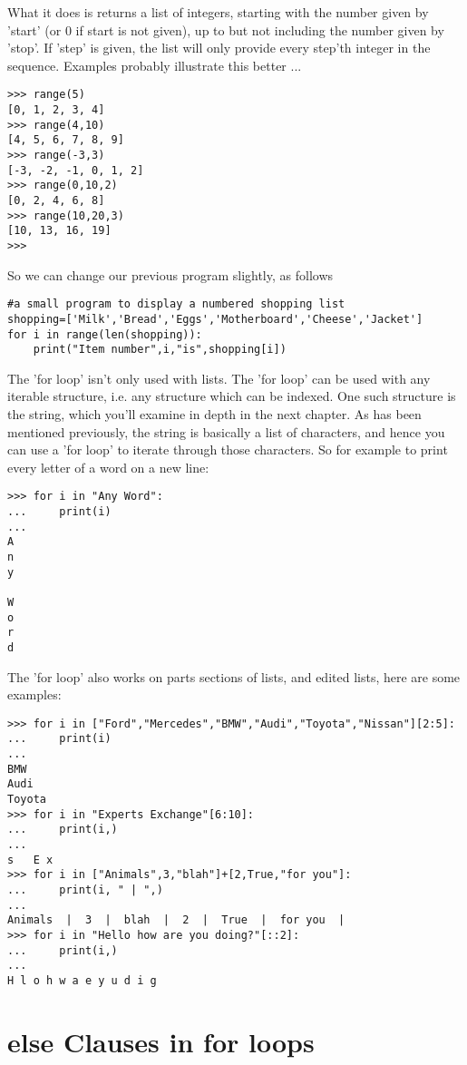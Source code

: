 What it does is returns a list of integers, starting with the number   given by 'start' (or 0 if start is not given), up to but not including   the number given by 'stop'. If 'step' is given, the list will only   provide every step'th integer in the sequence. Examples probably   illustrate this better ...
\begin{lstlisting}
>>> range(5)
[0, 1, 2, 3, 4]
>>> range(4,10)
[4, 5, 6, 7, 8, 9]
>>> range(-3,3)
[-3, -2, -1, 0, 1, 2]
>>> range(0,10,2)
[0, 2, 4, 6, 8]
>>> range(10,20,3)
[10, 13, 16, 19]
>>>
\end{lstlisting}

So we can change our previous program slightly, as follows
\begin{lstlisting}
#a small program to display a numbered shopping list
shopping=['Milk','Bread','Eggs','Motherboard','Cheese','Jacket']
for i in range(len(shopping)):
    print("Item number",i,"is",shopping[i])
\end{lstlisting}

The 'for loop' isn't only used with lists. The 'for loop' can be used with any iterable structure, i.e. any structure which can be indexed. One such structure is the string, which you'll examine in depth in the next chapter. As has been mentioned previously, the string is basically a list of characters, and hence you can use a 'for loop' to iterate through those characters. So for example to print every letter of a word on a new line:   
\begin{lstlisting}
>>> for i in "Any Word":
...     print(i)
... 
A
n
y
 
W
o
r
d
\end{lstlisting}

 The 'for loop' also works on parts sections of lists, and edited lists, here are some examples:
\begin{lstlisting}
>>> for i in ["Ford","Mercedes","BMW","Audi","Toyota","Nissan"][2:5]:
...     print(i)
... 
BMW
Audi
Toyota
>>> for i in "Experts Exchange"[6:10]:
...     print(i,)
... 
s   E x
>>> for i in ["Animals",3,"blah"]+[2,True,"for you"]:
...     print(i, " | ",)
... 
Animals  |  3  |  blah  |  2  |  True  |  for you  | 
>>> for i in "Hello how are you doing?"[::2]:
...     print(i,)
... 
H l o h w a e y u d i g
\end{lstlisting}

\section{else Clauses in for loops}

